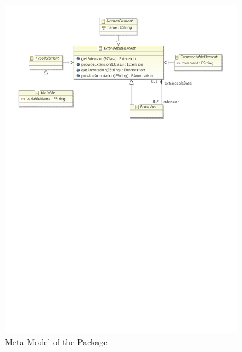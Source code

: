 %
%

\begin{figure}[htb]
  \centering
  \includegraphics[width=0.9\textwidth]{figures/A_technical-reference/packages/modeling/ModelingDiag}
  \caption{Meta-Model of the  Package}
  \label{fig:MM:modeling}
\end{figure}
